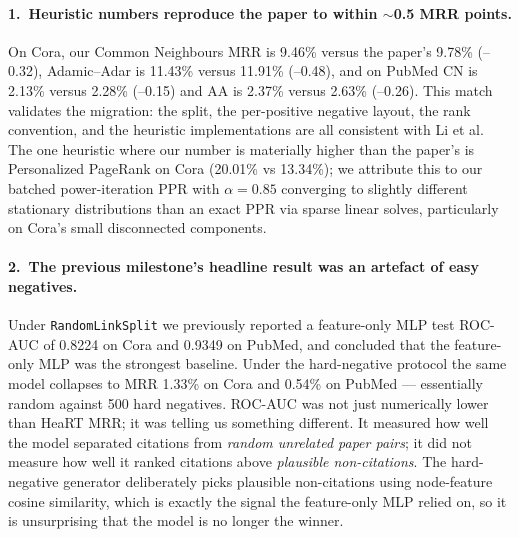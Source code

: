 \documentclass[10pt,a4paper]{article}
\begin{document}
\paragraph{1.\ Heuristic numbers reproduce the paper to within $\sim$0.5 MRR points.}
On Cora, our Common Neighbours MRR is 9.46\% versus the paper's
9.78\% (--0.32), Adamic--Adar is 11.43\% versus 11.91\% (--0.48), and
on PubMed CN is 2.13\% versus 2.28\% (--0.15) and AA is 2.37\% versus
2.63\% (--0.26). This match validates the migration: the split, the
per-positive negative layout, the rank convention, and the heuristic
implementations are all consistent with Li et al. The one heuristic
where our number is materially higher than the paper's is Personalized
PageRank on Cora (20.01\% vs 13.34\%); we attribute this to our
batched power-iteration PPR with $\alpha = 0.85$ converging to slightly
different stationary distributions than an exact PPR via sparse linear
solves, particularly on Cora's small disconnected components.

\paragraph{2.\ The previous milestone's headline result was an artefact of easy negatives.}
Under \texttt{RandomLinkSplit} we previously reported a feature-only
MLP test ROC-AUC of 0.8224 on Cora and 0.9349 on PubMed, and concluded
that the feature-only MLP was the strongest baseline. Under the
hard-negative protocol the same model collapses to MRR 1.33\% on Cora
and 0.54\% on PubMed --- essentially random against 500 hard negatives.
ROC-AUC was not just numerically lower than HeaRT MRR; it was telling
us something different. It measured how well the model separated
citations from \emph{random unrelated paper pairs}; it did not measure
how well it ranked citations above \emph{plausible non-citations}. The
hard-negative generator deliberately picks plausible non-citations
using node-feature cosine similarity, which is exactly the signal the
feature-only MLP relied on, so it is unsurprising that the model is no
longer the winner.
\end{document}
